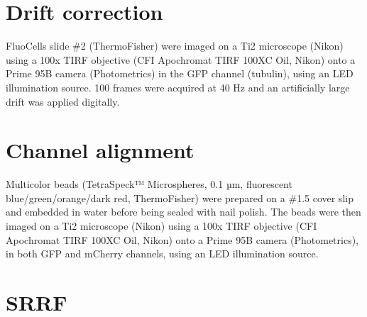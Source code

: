 

\onecolumn %
\fancyhead{} %
\renewcommand{\floatpagefraction}{0.1}
\lfoot[\bSupInf]{\dAuthor}
\rfoot[\dAuthor]{\cSupInf}
\newpage

\captionsetup*{format=largeformat} %
\setcounter{figure}{0} %
\setcounter{equation}{0} %
\setcounter{table}{0} %
\setcounter{page}{1} %
\makeatletter
\renewcommand{\thefigure}{S\@arabic\c@figure} %
\makeatother
\makeatletter
\renewcommand{\thetable}{S\@arabic\c@table} %
\makeatother
\makeatletter
\renewcommand{\theequation}{S\@arabic\c@equation} %
\makeatother




\tableofcontents

\newpage
\section{Drift correction}
FluoCells slide \#2 (ThermoFisher) were imaged on a Ti2 microscope (Nikon) using a 100x TIRF objective (CFI Apochromat TIRF 100XC Oil, Nikon) onto a Prime 95B camera (Photometrics) in the GFP channel (tubulin), using an LED illumination source. 100 frames were acquired at 40 Hz and an artificially large drift was applied digitally.


\section{Channel alignment}

Multicolor beads (TetraSpeck™ Microspheres, 0.1 µm, fluorescent blue/green/orange/dark red, ThermoFisher) were prepared on a \#1.5 cover slip and embedded in water before being sealed with nail polish. The beads were then imaged on a Ti2 microscope (Nikon) using a 100x TIRF objective (CFI Apochromat TIRF 100XC Oil, Nikon) onto a Prime 95B camera (Photometrics), in both GFP and mCherry channels, using an LED illumination source. 

\section{SRRF}

